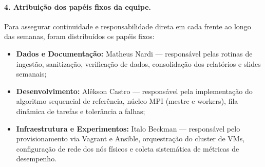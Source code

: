 \paragraph{4. Atribuição dos papéis fixos da equipe.}
Para assegurar continuidade e responsabilidade direta em cada frente ao longo
das semanas, foram distribuídos os papéis fixos:
\begin{itemize}
  \item \textbf{Dados e Documentação:} Matheus Nardi — responsável pelas
    rotinas de ingestão, sanitização, verificação de dados, consolidação dos
    relatórios e slides semanais;
  \item \textbf{Desenvolvimento:} Alêkson Castro — responsável pela
    implementação do algoritmo sequencial de referência, núcleo MPI (mestre e
    workers), fila dinâmica de tarefas e tolerância a falhas;
  \item \textbf{Infraestrutura e Experimentos:} Italo Beckman — responsável pelo
    provisionamento via Vagrant e Ansible, orquestração do cluster de VMs,
    configuração de rede dos nós físicos e coleta sistemática de métricas de
    desempenho.
\end{itemize}
